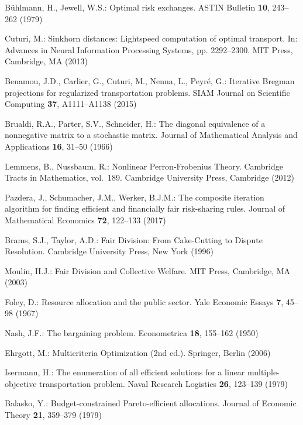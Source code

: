 \documentclass{article}
\theoremstyle{definition}
\begin{document}
\begin{thebibliography}{10}
B\"{u}hlmann, H., Jewell, W.S.: Optimal risk exchanges.
\newblock ASTIN Bulletin \textbf{10}, 243--262 (1979)

Cuturi, M.: Sinkhorn distances: Lightspeed computation of optimal transport.
\newblock In: Advances in Neural Information Processing Systems, pp.
  2292--2300. MIT Press, Cambridge, MA (2013)

Benamou, J.D., Carlier, G., Cuturi, M., Nenna, L., Peyr{\'e}, G.: Iterative
  {B}regman projections for regularized transportation problems.
\newblock SIAM Journal on Scientific Computing \textbf{37}, A1111--A1138 (2015)

Brualdi, R.A., Parter, S.V., Schneider, H.: The diagonal equivalence of a
  nonnegative matrix to a stochastic matrix.
\newblock Journal of Mathematical Analysis and Applications \textbf{16}, 31--50
  (1966)

Lemmens, B., Nussbaum, R.: Nonlinear Perron-Frobenius Theory.
\newblock Cambridge Tracts in Mathematics, vol.~189. Cambridge University
  Press, Cambridge (2012)

Pazdera, J., Schumacher, J.M., Werker, B.J.M.: The composite iteration
  algorithm for finding efficient and financially fair risk-sharing rules.
\newblock Journal of Mathematical Economics \textbf{72}, 122--133 (2017)

Brams, S.J., Taylor, A.D.: Fair Division: From Cake-Cutting to Dispute
  Resolution.
\newblock Cambridge University Press, New York (1996)

Moulin, H.J.: Fair Division and Collective Welfare.
\newblock MIT Press, Cambridge, MA (2003)

Foley, D.: Resource allocation and the public sector.
\newblock Yale Economic Essays \textbf{7}, 45--98 (1967)

Nash, J.F.: The bargaining problem.
\newblock Econometrica \textbf{18}, 155--162 (1950)

Ehrgott, M.: Multicriteria Optimization \rm (2nd ed.).
\newblock Springer, Berlin (2006)

Isermann, H.: The enumeration of all efficient solutions for a linear
  multiple-objective transportation problem.
\newblock Naval Research Logistics \textbf{26}, 123--139 (1979)

Balasko, Y.: Budget-constrained {P}areto-efficient allocations.
\newblock Journal of Economic Theory \textbf{21}, 359--379 (1979)


\end{thebibliography}
\end{document}
